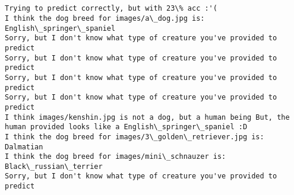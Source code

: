 \documentclass[11pt]{article}
\begin{document}
    \begin{Verbatim}[commandchars=\\\{\}]


Trying to predict correctly, but with 23\% acc :'(
I think the dog breed for images/a\_dog.jpg is: English\_springer\_spaniel
Sorry, but I don't know what type of creature you've provided to predict
Sorry, but I don't know what type of creature you've provided to predict
Sorry, but I don't know what type of creature you've provided to predict
Sorry, but I don't know what type of creature you've provided to predict
I think images/kenshin.jpg is not a dog, but a human being But, the human provided looks like a English\_springer\_spaniel :D
I think the dog breed for images/3\_golden\_retriever.jpg is: Dalmatian
I think the dog breed for images/mini\_schnauzer is: Black\_russian\_terrier
Sorry, but I don't know what type of creature you've provided to predict

    \end{Verbatim}


    
    
    
    
\end{document}
